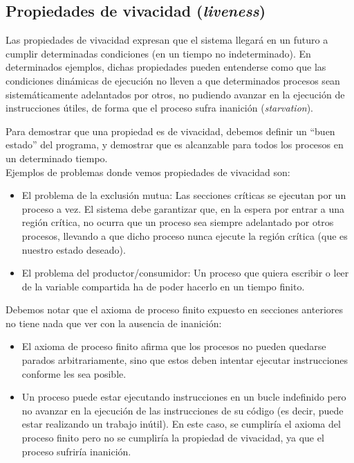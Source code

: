 \subsection{Propiedades de vivacidad (\textit{liveness})}
Las propiedades de vivacidad expresan que el sistema llegará en un futuro a cumplir determinadas condiciones (en un tiempo no indeterminado). En determinados ejemplos, dichas propiedades pueden entenderse como que las condiciones dinámicas de ejecución no lleven a que determinados procesos sean sistemáticamente adelantados por otros, no pudiendo avanzar en la ejecución de instrucciones útiles, de forma que el proceso sufra inanición (\textit{starvation}).

Para demostrar que una propiedad es de vivacidad, debemos definir un ``buen estado'' del programa, y demostrar que es alcanzable para todos los procesos en un determinado tiempo.\\

Ejemplos de problemas donde vemos propiedades de vivacidad son:
\begin{itemize}
    \item El problema de la exclusión mutua: Las secciones críticas se ejecutan por un proceso a vez. El sistema debe garantizar que, en la espera por entrar a una región crítica, no ocurra que un proceso sea siempre adelantado por otros procesos, llevando a que dicho proceso nunca ejecute la región crítica (que es nuestro estado deseado).
    \item El problema del productor/consumidor: Un proceso que quiera escribir o leer de la variable compartida ha de poder hacerlo en un tiempo finito.
\end{itemize}

Debemos notar que el axioma de proceso finito expuesto en secciones anteriores no tiene nada que ver con la ausencia de inanición:
\begin{itemize}
    \item El axioma de proceso finito afirma que los procesos no pueden quedarse parados arbitrariamente, sino que estos deben intentar ejecutar instrucciones conforme les sea posible.
    \item Un proceso puede estar ejecutando instrucciones en un bucle indefinido pero no avanzar en la ejecución de las instrucciones de su código (es decir, puede estar realizando un trabajo inútil). En este caso, se cumpliría el axioma del proceso finito pero no se cumpliría la propiedad de vivacidad, ya que el proceso sufriría inanición.
\end{itemize}

